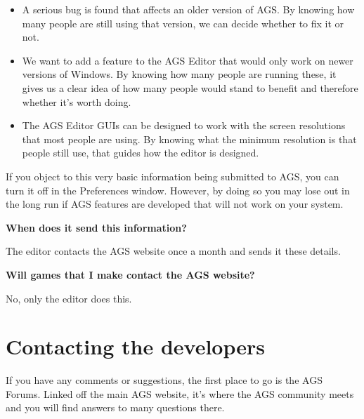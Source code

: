 \begin{itemize}
\item A serious bug is found that affects an older version of AGS. By knowing how
many people are still using that version, we can decide whether to fix it or not.
\item We want to add a feature to the AGS Editor that would only work on newer versions of Windows. By
knowing how many people are running these, it gives us a clear idea of how many
people would stand to benefit and therefore whether it's worth doing.
\item The AGS Editor GUIs can be designed to work with the screen resolutions
that most people are using. By knowing what the minimum resolution is that people
still use, that guides how the editor is designed.
\end{itemize}

If you object to this very basic information being submitted to AGS, you can
turn it off in the Preferences window. However, by doing so you may lose out in
the long run if AGS features are developed that will not work on your system.

\bf{When does it send this information?}

The editor contacts the AGS website once a month and sends it these details.

\bf{Will games that I make contact the AGS website?}

No, only the editor does this.



\chapter{Contacting the developers}%

If you have any comments or suggestions, the first place to go is the AGS
Forums. Linked off the main AGS website, it's where the AGS community
meets and you will find answers to many questions there.

